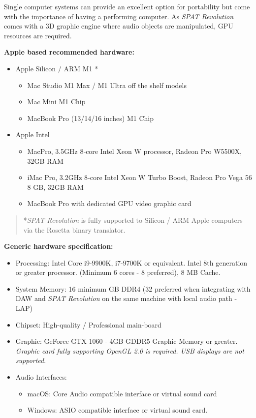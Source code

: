 \documentclass[
  letterpaper,
  DIV=11,
  numbers=noendperiod]{scrreport}
\providecommand{\tightlist}{%
  \setlength{\itemsep}{0pt}\setlength{\parskip}{0pt}}\usepackage{longtable,booktabs,array}
\begin{document}
Single computer systems can provide an excellent option for portability
but come with the importance of having a performing computer. As
\emph{SPAT Revolution} comes with a 3D graphic engine where audio
objects are manipulated, GPU resources are required.

\textbf{Apple based recommended hardware:}

\begin{itemize}
\tightlist
\item
  Apple Silicon / ARM M1 *

  \begin{itemize}
  \tightlist
  \item
    Mac Studio M1 Max / M1 Ultra off the shelf models
  \item
    Mac Mini M1 Chip
  \item
    MacBook Pro (13/14/16 inches) M1 Chip
  \end{itemize}
\item
  Apple Intel

  \begin{itemize}
  \tightlist
  \item
    MacPro, 3.5GHz 8‑core Intel Xeon W processor, Radeon Pro W5500X,
    32GB RAM
  \item
    iMac Pro, 3.2GHz 8‑core Intel Xeon W Turbo Boost, Radeon Pro Vega 56
    8 GB, 32GB RAM
  \item
    MacBook Pro with dedicated GPU video graphic card
  \end{itemize}
\end{itemize}

\begin{quote}
*\emph{SPAT Revolution} is fully supported to Silicon / ARM Apple
computers via the Rosetta binary translator.
\end{quote}

\textbf{Generic hardware specification:}

\begin{itemize}
\tightlist
\item
  Processing: Intel Core i9-9900K, i7-9700K or equivalent. Intel 8th
  generation or greater processor. (Minimum 6 cores - 8 preferred), 8 MB
  Cache.
\item
  System Memory: 16 minimum GB DDR4 (32 preferred when integrating with
  DAW and \emph{SPAT Revolution} on the same machine with local audio
  path - LAP)
\item
  Chipset: High-quality / Professional main-board
\item
  Graphic: GeForce GTX 1060 - 4GB GDDR5 Graphic Memory or greater.
  \emph{Graphic card fully supporting OpenGL 2.0 is required. USB
  displays are not supported}.
\item
  Audio Interfaces:

  \begin{itemize}
  \tightlist
  \item
    macOS: Core Audio compatible interface or virtual sound card
  \item
    Windows: ASIO compatible interface or virtual sound card.
  \end{itemize}
\end{itemize}
\end{document}
